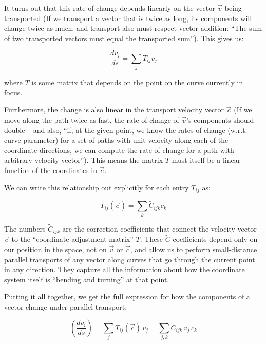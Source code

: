\documentclass[twocolumn]{article}
\begin{document}
It turns out that this rate of change depends linearly on the vector
\(\vec{v}\) being transported (If we transport a vector that is twice
as long, its components will change twice as much, and transport also
must respect vector addition: ``The sum of two transported vectors
must equal the transported sum''). This gives us:

\begin{equation}\frac{dv_i}{ds} = \sum_j T_{ij} v_j\end{equation}

where \(T\) is some matrix that depends on the point on the curve
currently in focus.

Furthermore, the change is also linear in the transport velocity
vector \(\vec{c}\) (If we move along the path twice as fast, the rate
of change of \(\vec{v}\)'s components should double -- and also, ``if,
at the given point, we know the rates-of-change
(w.r.t. curve-parameter) for a set of paths with unit velocity along
each of the coordinate directions, we can compute the rate-of-change
for a path with arbitrary velocity-vector''). This means the matrix
\(T\) must itself be a linear function of the coordinates in \(\vec{c}\).

We can write this relationship out explicitly for each entry
\(T_{ij}\)\hspace{0pt} as:

\begin{equation}T_{ij}(\vec{c}) = \sum_k \tilde C_{ijk} c_k\end{equation}

The numbers \(\tilde C_{ijk}\) are the correction-coefficients that
connect the velocity vector \(\vec{c}\) to the ``coordinate-adjustment
matrix'' \(T\). These \(\tilde C\)-coefficients depend only on our
position in the space, not on \(\vec{v}\) or \(\vec{c}\), and allow us
to perform small-distance parallel transports of any vector along
curves that go through the current point in any direction. They
capture all the information about how the coordinate system itself is
``bending and turning'' at that point.

Putting it all together, we get the full expression for how the
components of a vector change under parallel transport:

\begin{equation}\left( \frac{d v_i}{d s} \right) = \sum_j T_{ij}(\vec{c}) \, v_j = \sum_{j,k} \tilde C_{ijk} \, v_j \, c_k\end{equation}
\end{document}
